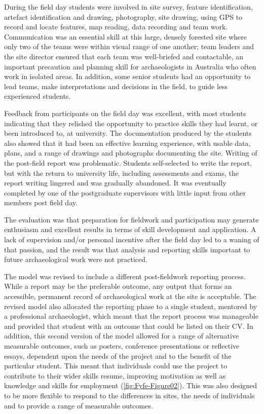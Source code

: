\documentclass[%
]{ijsra}
\begin{document}
	During the field day students were involved in site survey, feature identification, artefact identification and drawing, photography, site drawing, using GPS to record and locate features, map reading, data recording and team work. 
	Communication was an essential skill at this large, densely forested site where only two of the teams were within visual range of one another; team leaders and the site director ensured that each team was well-briefed and contactable, an important precaution and planning skill for archaeologists in Australia who often work in isolated areas. 
	In addition, some senior students had an opportunity to lead teams, make interpretations and decisions in the field, to guide less experienced students.
	
	
	Feedback from participants on the field day was excellent, with most students indicating that they relished the opportunity to practice skills they had learnt, or been introduced to, at university. 
	The documentation produced by the students also showed that it had been an effective learning experience, with usable data, plans, and a range of drawings and photographs documenting the site. 
	Writing of the post-field report was problematic. Students self-selected to write the report, but with the return to university life, including assessments and exams, the report writing lingered and was gradually abandoned. It was eventually completed by one of the postgraduate supervisors with little input from other members post field day.
	
	The evaluation was that preparation for fieldwork and participation may generate enthusiasm and excellent results in terms of skill development and application. 
	A lack of supervision and/or personal incentive after the field day led to a waning of that passion, and the result was that analysis and reporting skills important to future archaeological work were not practiced.
	
	The model was revised to include a different post-fieldwork reporting process. While a report may be the preferable outcome, any output that forms an accessible, permanent record of archaeological work at the site is acceptable. 
	The revised model also allocated the reporting phase to a single student, mentored by a professional archaeologist, which meant that the report process was manageable and provided that student with an outcome that could be listed on their CV. 
	In addition, this second version of the model allowed for a range of alternative measurable outcomes, such as posters, conference presentations or reflective essays, dependent upon the needs of the project and to the benefit of the particular student. 
	This meant that individuals could use the project to contribute to their wider skills resume, improving motivation as well as knowledge and skills for employment (\cref{fig:Fyfe-Figure02}). This was also designed to be more flexible to respond to the differences in sites, the needs of individuals and to provide a range of measurable outcomes.
	
\end{document}
